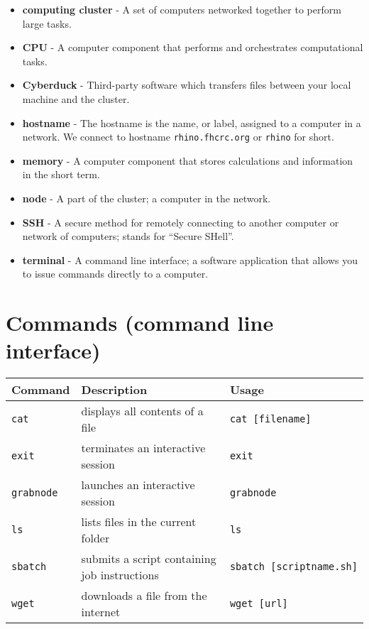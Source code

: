\documentclass[
]{book}
\providecommand{\tightlist}{%
  \setlength{\itemsep}{0pt}\setlength{\parskip}{0pt}}
\begin{document}
\begin{itemize}
\tightlist
\item
  \textbf{computing cluster} - A set of computers networked together to perform large tasks.
\item
  \textbf{CPU} - A computer component that performs and orchestrates computational tasks.
\item
  \textbf{Cyberduck} - Third-party software which transfers files between your local machine and the cluster.
\item
  \textbf{hostname} - The hostname is the name, or label, assigned to a computer in a network. We connect to hostname \texttt{rhino.fhcrc.org} or \texttt{rhino} for short.
\item
  \textbf{memory} - A computer component that stores calculations and information in the short term.
\item
  \textbf{node} - A part of the cluster; a computer in the network.
\item
  \textbf{SSH} - A secure method for remotely connecting to another computer or network of computers; stands for ``Secure SHell''.
\item
  \textbf{terminal} - A command line interface; a software application that allows you to issue commands directly to a computer.
\end{itemize}

\hypertarget{commands-command-line-interface}{%
\section{Commands (command line interface)}\label{commands-command-line-interface}}

\begin{longtable}[]{@{}lll@{}}
\toprule
Command & Description & Usage \\
\midrule
\endhead
\texttt{cat} & displays all contents of a file & \texttt{cat\ {[}filename{]}} \\
\texttt{exit} & terminates an interactive session & \texttt{exit} \\
\texttt{grabnode} & launches an interactive session & \texttt{grabnode} \\
\texttt{ls} & lists files in the current folder & \texttt{ls} \\
\texttt{sbatch} & submits a script containing job instructions & \texttt{sbatch\ {[}scriptname.sh{]}} \\
\texttt{wget} & downloads a file from the internet & \texttt{wget\ {[}url{]}} \\
\bottomrule
\end{longtable}
\end{document}
